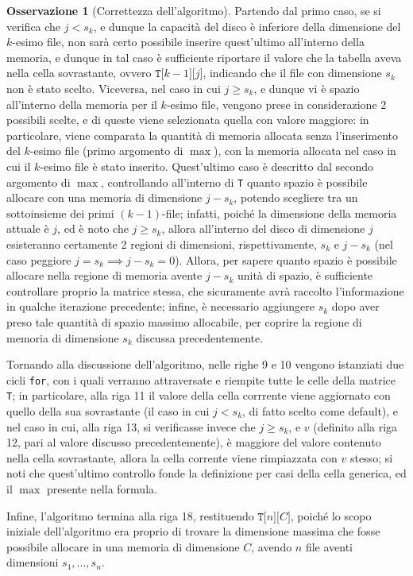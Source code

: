 \documentclass[14pt]{extreport}
\theoremstyle{definition}
\theoremstyle{definition}
\newtheorem{remark}{Osservazione}[subsection]
\begin{document}
\begin{remark}[Correttezza dell'algoritmo]
    Partendo dal primo caso, se si verifica che $j < s_k$, e dunque la capacità del disco è inferiore della dimensione del $k$-esimo file, non sarà certo possibile inserire quest'ultimo all'interno della memoria, e dunque in tal caso è sufficiente riportare il valore che la tabella aveva nella cella sovrastante, ovvero $\texttt{T[}k-1\texttt{][}j\texttt{]}$, indicando che il file con dimensione $s_k$ non è stato scelto. Viceversa, nel caso in cui $j \ge s_k$, e dunque vi è spazio all'interno della memoria per il $k$-esimo file, vengono prese in considerazione 2 possibili scelte, e di queste viene selezionata quella con valore maggiore: in particolare, viene comparata la quantità di memoria allocata senza l'inserimento del $k$-esimo file (primo argomento di $\max$), con la memoria allocata nel caso in cui il $k$-esimo file è stato inserito. Quest'ultimo caso è descritto dal secondo argomento di $\max$, controllando all'interno di \texttt{T} quanto spazio è possibile allocare con una memoria di dimensione $j - s_k$, potendo scegliere tra un sottoinsieme dei primi $(k - 1)$-file; infatti, poiché la dimensione della memoria attuale è $j$, ed è noto che $j \ge s_k$, allora all'interno del disco di dimensione $j$ esisteranno certamente 2 regioni di dimensioni, rispettivamente, $s_k$ e $j - s_k$ (nel caso peggiore $j = s_k \implies j - s_k = 0$). Allora, per sapere quanto spazio è possibile allocare nella regione di memoria avente $j - s_k$ unità di spazio, è sufficiente controllare proprio la matrice stessa, che sicuramente avrà raccolto l'informazione in qualche iterazione precedente; infine, è necessario aggiungere $s_k$ dopo aver preso tale quantità di spazio massimo allocabile, per coprire la regione di memoria di dimensione $s_k$ discussa precedentemente.

    Tornando alla discussione dell'algoritmo, nelle righe 9 e 10 vengono istanziati due cicli \texttt{for}, con i quali verranno attraversate e riempite tutte le celle della matrice \texttt{T}; in particolare, alla riga 11 il valore della cella corrrente viene aggiornato con quello della sua sovrastante (il caso in cui $j < s_k$, di fatto scelto come default), e nel caso in cui, alla riga 13, si verificasse invece che $j \ge s_k$, e $v$ (definito alla riga 12, pari al valore discusso precedentemente), è maggiore del valore contenuto nella cella sovrastante, allora la cella corrente viene rimpiazzata con $v$ stesso; si noti che quest'ultimo controllo fonde la definizione per casi della cella generica, ed il $\max$ presente nella formula.

    Infine, l'algoritmo termina alla riga 18, restituendo $\texttt{T[}n\texttt{][}C\texttt{]}$, poiché lo scopo iniziale dell'algoritmo era proprio di trovare la dimensione massima che fosse possibile allocare in una memoria di dimensione $C$, avendo $n$ file aventi dimensioni $s_1, \ldots, s_n$.
\end{remark}
\end{document}
